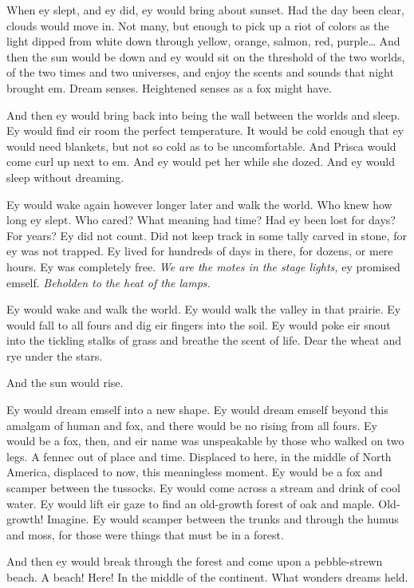 When ey slept, and ey did, ey would bring about sunset. Had the day been clear, clouds would move in. Not many, but enough to pick up a riot of colors as the light dipped from white down through yellow, orange, salmon, red, purple\ldots{} And then the sun would be down and ey would sit on the threshold of the two worlds, of the two times and two universes, and enjoy the scents and sounds that night brought em. Dream senses. Heightened senses as a fox might have.

And then ey would bring back into being the wall between the worlds and sleep. Ey would find eir room the perfect temperature. It would be cold enough that ey would need blankets, but not so cold as to be uncomfortable. And Prisca would come curl up next to em. And ey would pet her while she dozed. And ey would sleep without dreaming.

Ey would wake again however longer later and walk the world. Who knew how long ey slept. Who cared? What meaning had time? Had ey been lost for days? For years? Ey did not count. Did not keep track in some tally carved in stone, for ey was not trapped. Ey lived for hundreds of days in there, for dozens, or mere hours. Ey was completely free. \emph{We are the motes in the stage lights,} ey promised emself. \emph{Beholden to the heat of the lamps.}

Ey would wake and walk the world. Ey would walk the valley in that prairie. Ey would fall to all fours and dig eir fingers into the soil. Ey would poke eir snout into the tickling stalks of grass and breathe the scent of life. Dear the wheat and rye under the stars.

And the sun would rise.

Ey would dream emself into a new shape. Ey would dream emself beyond this amalgam of human and fox, and there would be no rising from all fours. Ey would be a fox, then, and eir name was unspeakable by those who walked on two legs. A fennec out of place and time. Displaced to here, in the middle of North America, displaced to now, this meaningless moment. Ey would be a fox and scamper between the tussocks. Ey would come across a stream and drink of cool water. Ey would lift eir gaze to find an old-growth forest of oak and maple. Old-growth! Imagine. Ey would scamper between the trunks and through the humus and moss, for those were things that must be in a forest.

And then ey would break through the forest and come upon a pebble-strewn beach. A beach! Here! In the middle of the continent. What wonders dreams held.

